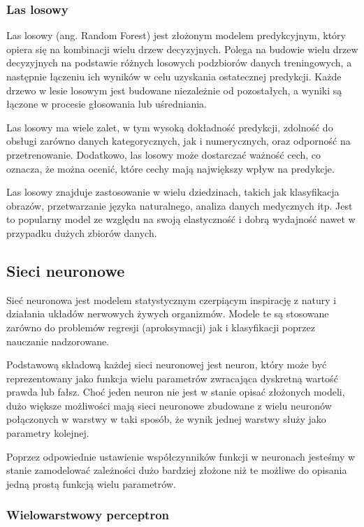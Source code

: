 \documentclass{article}
\begin{document}
\subsubsection{Las losowy}
Las losowy (ang. Random Forest) jest złożonym modelem 
predykcyjnym, który opiera się na kombinacji wielu drzew decyzyjnych. 
Polega na budowie wielu drzew decyzyjnych na podstawie 
różnych losowych podzbiorów danych treningowych, a 
następnie łączeniu ich wyników w celu uzyskania ostatecznej 
predykcji. Każde drzewo w lesie losowym jest budowane 
niezależnie od pozostałych, a wyniki są łączone w procesie 
głosowania lub uśredniania.

Las losowy ma wiele zalet, w tym wysoką dokładność 
predykcji, zdolność do obsługi zarówno danych 
kategorycznych, jak i numerycznych, oraz odporność 
na przetrenowanie. Dodatkowo, las losowy może dostarczać 
ważność cech, co oznacza, że można ocenić, które cechy 
mają największy wpływ na predykcje.

Las losowy znajduje zastosowanie w wielu dziedzinach, 
takich jak klasyfikacja obrazów, przetwarzanie 
języka naturalnego, analiza danych medycznych itp. 
Jest to popularny model ze względu na swoją elastyczność 
i dobrą wydajność nawet w przypadku dużych zbiorów danych.

\subsection{Sieci neuronowe}
Sieć neuronowa jest modelem statystycznym czerpiącym inspirację z natury i 
działania układów nerwowych żywych organizmów.
Modele te są stosowane zarówno do problemów regresji (aproksymacji) jak i klasyfikacji poprzez nauczanie nadzorowane.

Podstawową składową każdej sieci neuronowej jest neuron, który może być reprezentowany 
jako funkcja wielu parametrów zwracająca dyskretną wartość
prawda lub fałsz. Choć jeden neuron nie jest w stanie opisać złożonych modeli, 
dużo większe możliwości mają sieci neuronowe zbudowane z wielu neuronów
połączonych w warstwy w taki sposób, że wynik jednej warstwy służy jako parametry kolejnej.


Poprzez odpowiednie ustawienie współczynników funkcji w neuronach jesteśmy w 
stanie zamodelować zależności dużo bardziej złożone niż te możliwe do opisania jedną
prostą funkcją wielu parametrów.

\subsubsection{Wielowarstwowy perceptron}
\end{document}
